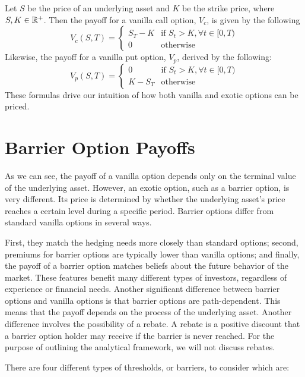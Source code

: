 Let $S$ be the price of an underlying asset and $K$ be the strike price, where $S,K\in\amsbb{R}^+$. Then the payoff for a vanilla call option, $V_c$, is given by the following
\begin{equation}\label{eq:vanilla_call}
	V_c(S,T)=\begin{cases}
		S_T-K  & \text{if }S_t>K,\forall t\in[0,T) \\
		0 & \text{otherwise}
	\end{cases}
\end{equation}
Likewise, the payoff for a vanilla put option, $V_p$, derived by the following:
\begin{equation}
	V_p(S,T)=\begin{cases}\label{eq:vanilla_put}
		0 & \text{if }S_t>K,\forall t\in[0,T) \\
		K-S_T  & \text{otherwise}
	\end{cases}
\end{equation}
These formulas drive our intuition of how both vanilla and exotic options can be priced.
\section{Barrier Option Payoffs}
As we can see, the payoff of a vanilla option depends only on the terminal value of the underlying asset. However, an exotic option, such as a barrier option, is very different. Its price is determined by whether the underlying asset's price reaches a certain level during a specific period. Barrier options differ from standard vanilla options in several ways. 

First, they match the hedging needs more closely than standard options; second, premiums for barrier options are typically lower than vanilla options; and finally, the payoff of a barrier option matches beliefs about the future behavior of the market. These features benefit many different types of investors, regardless of experience or financial needs. Another significant difference between barrier options and vanilla options is that barrier options are path-dependent. This means that the payoff depends on the process of the underlying asset. Another difference involves the possibility of a rebate. A rebate is a positive discount that a barrier option holder may receive if the barrier is never reached. For the purpose of outlining the analytical framework, we will not discuss rebates.

There are four different types of thresholds, or barriers, to consider which are:

